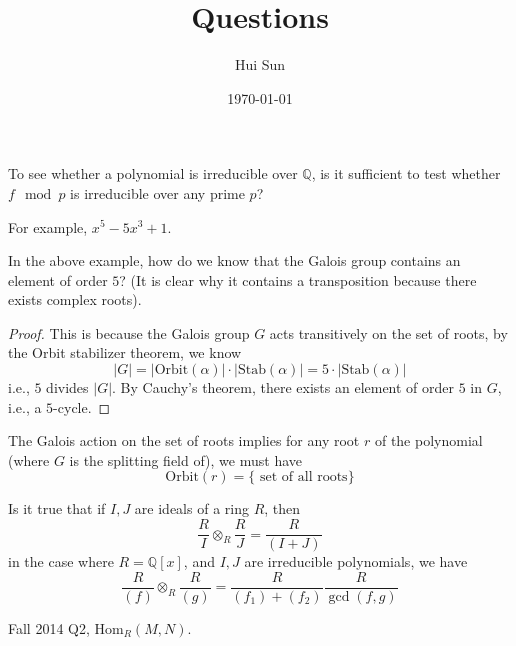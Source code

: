 \documentclass[openany]{book}
\title{Questions}
\date{\today}
\author{Hui Sun}
\newcommand{\Q}{\mathbb{Q}}
\begin{document}
\maketitle



\begin{prob}
    To see whether a polynomial is irreducible over $\Q$, is it sufficient to test whether $f\mod p$ is irreducible over any prime $p$?

    For example, $x^5-5x^3+1$.
\end{prob}


\begin{prob}
    In the above example, how do we know that the Galois group contains an element of order $5$? (It is clear why it contains a transposition because there exists complex roots).
\end{prob}
\begin{proof}
    This is because the Galois group $G$ acts transitively on the set of roots, by the Orbit stabilizer theorem, we know 
    \begin{equation*}
        |G|=|\text{Orbit}(\alpha)|\cdot|\text{Stab}(\alpha)|=5\cdot|\text{Stab}(\alpha)|
    \end{equation*}
    i.e., $5$ divides $|G|$. By Cauchy's theorem, there exists an element of order $5$ in $G$, i.e., a $5$-cycle.
\end{proof}

\begin{prob}
    The Galois action on the set of roots implies for any root $r$ of the polynomial (where $G$ is the splitting field of), we must have 
    \begin{equation*}
        \text{Orbit}(r)=\{\text{ set of all roots}\}
    \end{equation*}
\end{prob}

\begin{prob}
    Is it true that if $I,J$ are ideals of a ring $R$, then 
    \begin{equation*}
        \frac{R}{I}\otimes_R\frac{R}{J}=\frac{R}{(I+J)}
    \end{equation*}
    in the case where $R=\Q[x]$, and $I,J$ are irreducible polynomials, we have 
    \begin{equation*}
        \frac{R}{(f)}\otimes_R\frac{R}{(g)}=\frac{R}{(f_1)+(f_2)}\frac{R}{\gcd(f,g)}
    \end{equation*}
\end{prob}

\begin{prob}
    Fall 2014 Q2, $\text{Hom}_R(M,N)$.
\end{prob}
\end{document}
